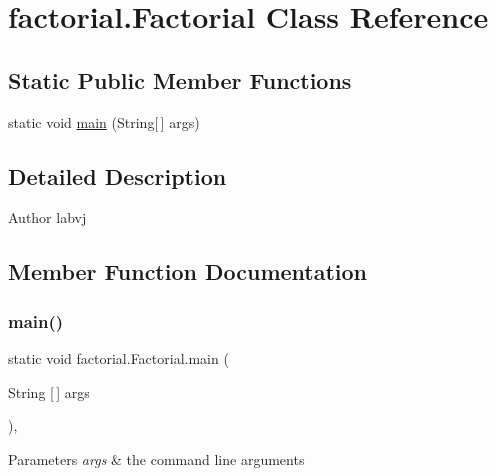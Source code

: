 \hypertarget{classfactorial_1_1_factorial}{}\section{factorial.\+Factorial Class Reference}
\label{classfactorial_1_1_factorial}
\subsection*{Static Public Member Functions}
\begin{DoxyCompactItemize}
\item 
static void \mbox{\hyperlink{classfactorial_1_1_factorial_abcf0086ce2454a721f00f76a6460715c}{main}} (String\mbox{[}$\,$\mbox{]} args)
\end{DoxyCompactItemize}


\subsection{Detailed Description}
\begin{DoxyAuthor}{Author}
labvj 
\end{DoxyAuthor}


\subsection{Member Function Documentation}
\mbox{\label{classfactorial_1_1_factorial_abcf0086ce2454a721f00f76a6460715c}} 
\subsubsection{\texorpdfstring{main()}{main()}}
{\footnotesize\ttfamily static void factorial.\+Factorial.\+main (\begin{DoxyParamCaption}\item[{String \mbox{[}$\,$\mbox{]}}]{args }\end{DoxyParamCaption})\hspace{0.3cm}{\ttfamily [inline]}, {\ttfamily [static]}}


\begin{DoxyParams}{Parameters}
{\em args} & the command line arguments \\
\hline
\end{DoxyParams}

